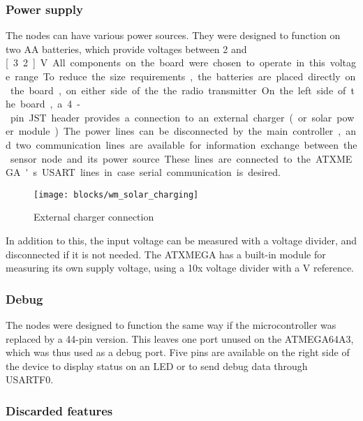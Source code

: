 \subsubsection{Power supply}

The nodes can have various power sources. They were designed to function on two
AA batteries, which provide voltages between 2 and \unit[3.2]{V}. All components on
the board were chosen to operate in this voltage range.

To reduce the size requirements, the batteries are placed directly on the board,
on either side of the the radio transmitter.

On the left side of the board, a 4-pin JST header provides a connection to an
external charger (or solar power module). The power lines can be disconnected by
the main controller, and two communication lines are available for information
exchange between the sensor node and its power source. These lines are connected
to the ATXMEGA's USART lines in case serial communication is desired.

\begin{figure}[h]
  \begin{center}
    \texttt{[image: blocks/wm\_solar\_charging]}
  \end{center}
  \caption{External charger connection}
  \label{fig:solar-charger}
\end{figure}

In addition to this, the input voltage can be measured with a voltage divider,
and disconnected if it is not needed. The ATXMEGA has a built-in module for
measuring its own supply voltage, using a 10x voltage divider with a \unit[1]{V}
reference.

\subsubsection{Debug}

The nodes were designed to function the same way if the microcontroller was
replaced by a 44-pin version. This leaves one port unused on the ATMEGA64A3,
which was thus used as a debug port. Five pins are available on the right side
of the device to display status on an LED or to send debug data through USARTF0.

\subsubsection{Discarded features}

